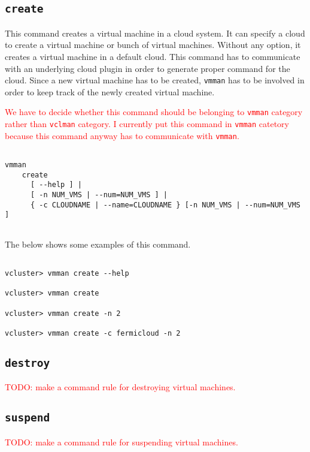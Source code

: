 \documentclass[11pt]{article}
\def \ttt{\texttt}
\def \vb{\verb}
\begin{document}
\subsection{\ttt{create}}

This command creates a virtual machine in a cloud system. It can specify a cloud to create a virtual machine or bunch of virtual machines. Without any option, it creates a virtual machine in a default cloud. This command has to communicate with an underlying cloud plugin in order to generate proper command for the cloud. Since a new virtual machine has to be created, \vb+vmman+ has to be involved in order to keep track of the newly created virtual machine.

\textcolor{red}{We have to decide whether this command should be belonging to \ttt{vmman} category rather than \ttt{vclman} category. I currently put this command in \ttt{vmman} catetory because this command anyway has to communicate with \ttt{vmman}.}

\begin{Verbatim}[fontfamily=courier, fontsize = \small, obeytabs
=true, tabsize=4, frame=lines]

vmman 
    create 
      [ --help ] |
      [ -n NUM_VMS | --num=NUM_VMS ] | 
      { -c CLOUDNAME | --name=CLOUDNAME } [-n NUM_VMS | --num=NUM_VMS ]  
      
\end{Verbatim}

The below shows some examples of this command.

\begin{Verbatim}[fontfamily=courier, fontsize = \small, obeytabs
=true, tabsize=4, frame=lines]

vcluster> vmman create --help

vcluster> vmman create  

vcluster> vmman create -n 2

vcluster> vmman create -c fermicloud -n 2

\end{Verbatim}



\subsection{\ttt{destroy}}
\textcolor{red}{TODO: make a command rule for destroying virtual machines.}



\subsection{\ttt{suspend}}
\textcolor{red}{TODO: make a command rule for suspending virtual machines.}
\end{document}
